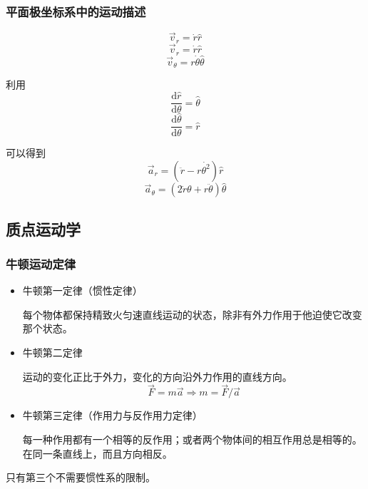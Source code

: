 \documentclass[UTF8]{ctexart}
\begin{document}
		\subsubsection{平面极坐标系中的运动描述}
			\begin{equation}
				\vec{v}_r = \dot{r}\hat{r}
			\end{equation}
			\begin{equation}
				\vec{v}_r = \dot{r}\hat{r}
			\end{equation}
			\begin{equation}
				\vec{v}_{\theta} = r\dot{\theta}\hat{\theta}
			\end{equation}
			\par 利用
			\begin{equation}
				\frac{\mathrm{d}\hat{r}}{\mathrm{d}\theta} = \hat{\theta}
			\end{equation}
			\begin{equation}
				\frac{\mathrm{d}\hat{\theta}}{\mathrm{d}\theta} = \hat{r}
			\end{equation}
			\par 可以得到
			\begin{equation}
				\vec{a}_r = (\ddot{r}-r\dot{\theta^2})\hat{r}
			\end{equation}
			\begin{equation}
				\vec{a}_\theta = (2\dot{r}{\theta}+r\ddot{\theta})\hat{\theta}
			\end{equation}

	\subsection{质点运动学}
		\subsubsection{牛顿运动定律}
			\begin{itemize}
				\item 牛顿第一定律（惯性定律）
					\par 每个物体都保持精致火匀速直线运动的状态，除非有外力作用于他迫使它改变那个状态。
				\item 牛顿第二定律
					\par 运动的变化正比于外力，变化的方向沿外力作用的直线方向。
					\begin{equation}
						\vec{F} = m\vec{a} \Rightarrow m = \vec{F}/\vec{a}
					\end{equation}
				\item 牛顿第三定律（作用力与反作用力定律）
					\par 每一种作用都有一个相等的反作用；或者两个物体间的相互作用总是相等的。在同一条直线上，而且方向相反。
			\end{itemize}
			\par 只有第三个不需要惯性系的限制。
\end{document}
